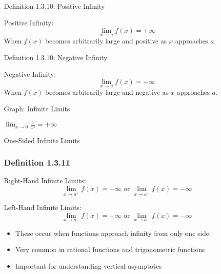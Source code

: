 \documentclass[aspectratio=169]{beamer}
\newcommand{\limxap}[1]{\lim_{x \to a^+} #1}
\newcommand{\limxam}[1]{\lim_{x \to a^-} #1}
\begin{document}
\begin{frame}{Definition 1.3.10: Positive Infinity}
\begin{block}{Positive Infinity:}
$$\lim_{x\to a} f(x) = +\infty$$
When $f(x)$ becomes arbitrarily large and positive as $x$ approaches $a$.
\end{block}
\end{frame}

\begin{frame}{Definition 1.3.10: Negative Infinity}
\begin{block}{Negative Infinity:}
$$\lim_{x\to a} f(x) = -\infty$$
When $f(x)$ becomes arbitrarily large and negative as $x$ approaches $a$.
\end{block}
\end{frame}

\begin{frame}{Graph: Infinite Limits}
\begin{center}

\vspace{1em}
$\displaystyle \lim_{x\to 0} \frac{1}{x^2} = +\infty$
\end{center}
\end{frame}

\begin{frame}{One-Sided Infinite Limits}
\frametitle{Definition 1.3.11}

\begin{block}{Right-Hand Infinite Limits:}
$$\limxap{f(x)} = +\infty \text{ or } \limxap{f(x)} = -\infty$$
\end{block}

\begin{block}{Left-Hand Infinite Limits:}
$$\limxam{f(x)} = +\infty \text{ or } \limxam{f(x)} = -\infty$$
\end{block}

\begin{itemize}
\item These occur when functions approach infinity from only one side
\item Very common in rational functions and trigonometric functions
\item Important for understanding vertical asymptotes
\end{itemize}

\end{frame}
\end{document}
